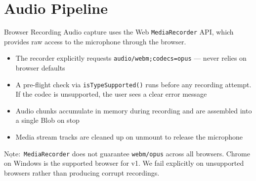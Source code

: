 \documentclass{beamer}
\newcommand{\nt}{$\underline{\text{Note}}:$ }
\begin{document}
\section{Audio Pipeline}

\begin{frame}{Browser Recording}
    \small
    Audio capture uses the Web \texttt{MediaRecorder} API, which
    provides raw access to the microphone through the browser.

    \vspace{0.3em}
    \begin{itemize}\setlength{\itemsep}{2pt}
        \item The recorder explicitly requests \texttt{audio/webm;codecs=opus}
              --- never relies on browser defaults
        \item A pre-flight check via \texttt{isTypeSupported()} runs before
              any recording attempt. If the codec is unsupported, the user
              sees a clear error message
        \item Audio chunks accumulate in memory during recording and are
              assembled into a single Blob on stop
        \item Media stream tracks are cleaned up on unmount to release
              the microphone
    \end{itemize}

    \vspace{0.1em}
    {\footnotesize\nt \texttt{MediaRecorder} does not guarantee \texttt{webm/opus} across
    all browsers. Chrome on Windows is the supported browser for v1.
    We fail explicitly on unsupported browsers rather than producing
    corrupt recordings.}
\end{frame}
\end{document}
